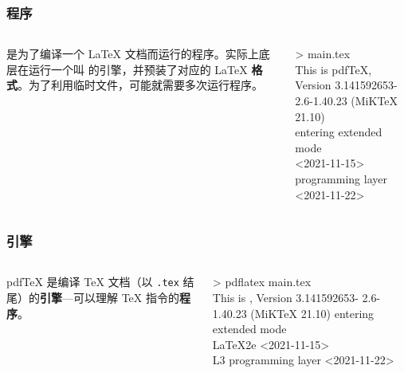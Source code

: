 \begin{shadedsection}
\begin{frame}
  \frametitle{程序}
  \begin{columns}[c]
    \begin{column}{0.7\textwidth}
      \begin{center}
        \rmfamily\Huge
      \end{center}
      \begin{center}
        \parbox{0.7\textwidth}{
           是为了编译一个 \LaTeX{} 文档而运行的程序。实际上底层在运行一个叫  的引擎，并预装了对应的 \LaTeX{} \textbf{格式}。为了利用临时文件，可能就需要多次运行程序。
        }
      \end{center}
    \end{column}
    \begin{column}{0.3\textwidth}
      \begin{block}{}
        \ttfamily\small
        >  main.tex\\
        This is pdfTeX, Version 3.141592653-
        2.6-1.40.23 (MiKTeX 21.10)\\
        entering extended mode\\
         <2021-11-15>\\
         programming layer <2021-11-22>
      \end{block}
    \end{column}
  \end{columns}
\end{frame}

\begin{frame}
  \frametitle{引擎}
  \begin{columns}[c]
    \begin{column}{0.7\textwidth}
      \begin{center}
        \rmfamily\Huge
        \highlight[structure!70]{\TeX{}}
      \end{center}
      \begin{center}
        \parbox{0.7\textwidth}{
          pdf\TeX{} 是编译 \TeX{} 文档（以 \texttt{.tex} 结尾）的\textbf{引擎}---可以理解 \TeX{} 指令的\textbf{程序}。
        }
      \end{center}
    \end{column}
    \begin{column}{0.3\textwidth}
      \begin{block}{}
        \ttfamily\small
        > pdflatex main.tex\\
        This is , Version 3.141592653-
        2.6-1.40.23 (MiKTeX 21.10)
        entering extended mode\\
        LaTeX2e <2021-11-15>\\
        L3 programming layer <2021-11-22>
      \end{block}
    \end{column}
  \end{columns}
\end{frame}


\end{shadedsection}
